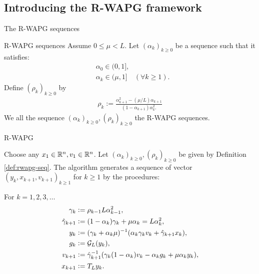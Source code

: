 \documentclass[11pt]{beamer}
\theoremstyle{definition}
\begin{document}
    \subsection{Introducing the R-WAPG framework}
        \begin{frame}{The R-WAPG sequences}
            \begin{definition}{R-WAPG sequences}\label{def:rwapg-seq}
                Assume $0 \le \mu < L$. 
                Let $(\alpha_k)_{k \ge 0}$ be a sequence such that it satisfies: 
                \begin{align*}
                    & \alpha_0 \in (0, 1], \\
                    & \alpha_k \in (\mu, 1] \quad (\forall k \ge 1). 
                \end{align*}    
                Define $(\rho_k)_{k \ge 0}$ by 
                \begin{align*}
                    \rho_k := \frac{\alpha_{k + 1}^2 - (\mu/L) \alpha_{k + 1}}{
                        (1 - \alpha_{k + 1}) \alpha_k^2.
                    }
                \end{align*}
                We all the sequence $(\alpha_k)_{k \ge 0}, (\rho_k)_{k \ge0}$ the R-WAPG sequences. 
            \end{definition}
        \end{frame}
        \begin{frame}{R-WAPG}
            \begin{definition}\label{def:wapg}
                Choose any $x_1 \in \mathbb R^n, v_1 \in \mathbb R^n$.
                Let $(\alpha_k)_{k \ge0}, (\rho_k)_{k \ge 0}$ be given by Definition \ref{def:rwapg-seq}.
                The algorithm generates a sequence of vector $(y_k, x_{k + 1}, v_{k + 1})_{k \ge 1}$ for $k\ge 1$ by the procedures:
                \begin{tcolorbox}
                    For $k=1, 2, 3, \ldots$
                    \begin{align*}
                        \gamma_k &\vcentcolon= \rho_{k -1}L\alpha_{k - 1}^2,
                        \\
                        \hat \gamma_{k + 1} & \vcentcolon= (1 - \alpha_k)\gamma_k + \mu \alpha_k = L\alpha_k^2,
                        \\
                        y_k &\vcentcolon=
                        (\gamma_k + \alpha_k \mu)^{-1}(\alpha_k \gamma_k v_k + \hat\gamma_{k + 1} x_k),
                        \\
                        g_k &\vcentcolon= \mathcal G_L (y_k),
                        \\
                        v_{k + 1} &\vcentcolon=
                        \hat\gamma^{-1}_{k + 1}
                        (\gamma_k(1 - \alpha_k) v_k - \alpha_k g_k + \mu \alpha_k y_k),
                        \\
                        x_{k + 1} &\vcentcolon= T_L y_k.
                    \end{align*}
                \end{tcolorbox}
            \end{definition}
        \end{frame}
\end{document}
